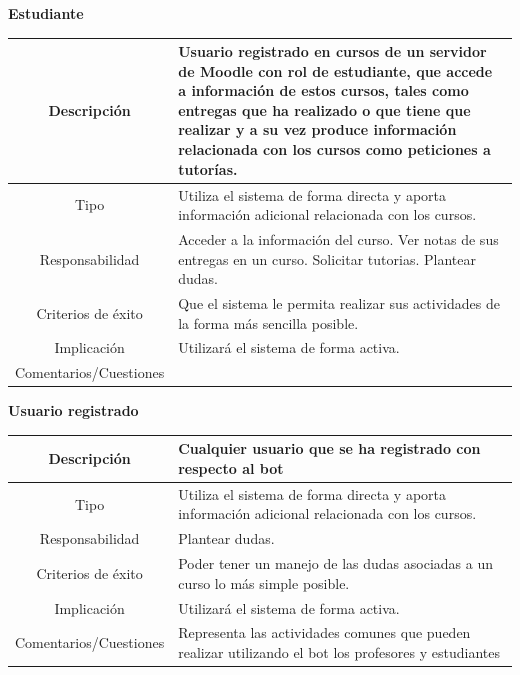 \textbf{Estudiante}

\begin{table}[H]
\begin{tabular}{|c|p{10cm}|}
\hline
{ Descripción } & {Usuario registrado en cursos de un servidor de Moodle con rol de estudiante, que accede a información de estos cursos, tales como entregas que ha realizado o que tiene que realizar y a su vez produce información relacionada con los cursos como peticiones a tutorías. }\\
\hline 
{ Tipo } & { Utiliza el sistema de forma directa y aporta información  adicional relacionada con los cursos.}  \\
\hline
{ Responsabilidad } & { Acceder a la información del curso.
Ver notas de sus entregas en un curso.
Solicitar tutorias.
Plantear dudas.
}  \\
\hline
{ Criterios de éxito }& { Que el sistema le permita realizar sus actividades de la forma más sencilla posible.}\\
\hline
{ Implicación }& { Utilizará el sistema de forma activa.} \\
\hline
{ Comentarios/Cuestiones }& { } \\
\hline

\end{tabular}
\end{table}

\textbf{Usuario registrado}

\begin{table}[H]
\begin{tabular}{|c|p{10cm}|}
\hline
{ Descripción } & {Cualquier usuario que se ha registrado con respecto al bot  }\\
\hline 
{ Tipo } & { Utiliza el sistema de forma directa y aporta información  adicional relacionada con los cursos.}  \\
\hline
{ Responsabilidad } & {
Plantear dudas.
}  \\
\hline
{ Criterios de éxito }& { Poder tener un manejo de las dudas asociadas a un curso lo más simple posible.}\\
\hline
{ Implicación }& { Utilizará el sistema de forma activa.} \\
\hline
{ Comentarios/Cuestiones }& { Representa las actividades comunes que pueden realizar utilizando el bot los profesores y estudiantes} \\
\hline

\end{tabular}
\end{table}

